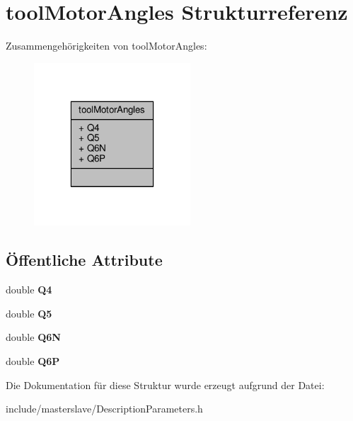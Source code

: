 \hypertarget{structtoolMotorAngles}{\section{tool\-Motor\-Angles Strukturreferenz}
\label{structtoolMotorAngles}
}


Zusammengehörigkeiten von tool\-Motor\-Angles\-:
\nopagebreak
\begin{figure}[H]
\begin{center}
\leavevmode
\includegraphics[width=166pt]{structtoolMotorAngles__coll__graph}
\end{center}
\end{figure}
\subsection*{Öffentliche Attribute}
\begin{DoxyCompactItemize}
\item 
\hypertarget{structtoolMotorAngles_a41e50f3d98f895173b2ebabea73350ac}{double {\bfseries Q4}}\label{structtoolMotorAngles_a41e50f3d98f895173b2ebabea73350ac}

\item 
\hypertarget{structtoolMotorAngles_a784134d746bab9b167b05fe3726f1926}{double {\bfseries Q5}}\label{structtoolMotorAngles_a784134d746bab9b167b05fe3726f1926}

\item 
\hypertarget{structtoolMotorAngles_a38d5906438b8617c8cbaae990b2ee626}{double {\bfseries Q6\-N}}\label{structtoolMotorAngles_a38d5906438b8617c8cbaae990b2ee626}

\item 
\hypertarget{structtoolMotorAngles_a42a9d5a3908822c03af99f9d17935041}{double {\bfseries Q6\-P}}\label{structtoolMotorAngles_a42a9d5a3908822c03af99f9d17935041}

\end{DoxyCompactItemize}


Die Dokumentation für diese Struktur wurde erzeugt aufgrund der Datei\-:\begin{DoxyCompactItemize}
\item 
include/masterslave/Description\-Parameters.\-h\end{DoxyCompactItemize}
